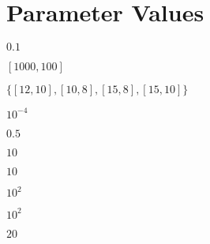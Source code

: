 \section*{Parameter Values}

\vspace{0.5cm}


\begin{description}[labelwidth=4em,leftmargin =\dimexpr\labelwidth+\labelsep\relax]

\item[$\alpha:$] $0.1$
\item[$\bm{PS}:$] $[1000, 100]$
\item[$KS:$] $\{[12, 10], [10, 8], [15, 8], [15, 10]\}$
\item[$\alpha:$] $10^{-4}$ 
\item[$\phi:$] $0.5$ 
\item[$\theta:$] $10$
\item[$\gamma:$] $10$
\item[$\beta:$] $10^2$ 
\item[$LS\_Iter:$] $10^2$ 
\item[$LS\_Max:$] $20$ 

\end{description}